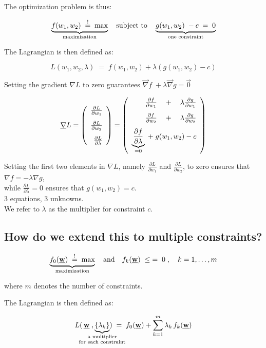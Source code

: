 \begin{frame}
The optimization problem is thus:

$$
\underbrace{f(w_1, w_2) \;\stackrel{\mathrm{!}}{=}\; \text{max}}_{\text{maximization}} \quad  \text{subject to} \quad \underbrace{g(w_1,w_2)\;-c\; = \; 0}_{\text{one constraint}}
$$

\newpage
The Lagrangian is then defined as:

$$
L(w_1, w_2, \lambda) \; = \; f(w_1,w_2) + \lambda(g(w_1, w_2)-c)
$$

Setting the gradient $\nabla L$ to zero guarantees $\vec \nabla f \;  + \lambda \vec \nabla g = \vec 0$

$$
\underline{\mathbf{\nabla}} L = 
\left( \begin{array}{rrrrrrrrrrrrrrrrrrrrrrrrrr} 
	\frac{\partial L}{\partial w_1} \\[0.3cm]
	\frac{\partial L}{\partial w_2} \\[0.3cm]
	\frac{\partial L}{\partial \lambda}
	\\ \end{array} \right)
=
\left( \begin{array}{rrrrrrrrrrrrrrrrrrrrrrrrrr} 
	\frac{\partial f}{\partial w_1} \quad+\quad \lambda \frac{\partial g}{\partial w_1} \\[0.3cm]
	\frac{\partial f}{\partial w_2} \quad+\quad \lambda \frac{\partial g}{\partial w_2} \\[0.3cm]
	\underbrace{\frac{\partial f}{\partial \lambda}}_{=0} \;+\; g(w_1, w_2)-c
	\\ \end{array} \right)
$$

Setting the first two elements in $\nabla L$, namely $\frac{\partial L}{\partial w_1}$ and $\frac{\partial L}{\partial w_2}$, to zero ensures that $\nabla f = -\lambda \nabla g$,\\
while $\frac{\partial L}{\partial \lambda}=0$ ensures that $g(w_1, w_2) = c$.\\

3 equations, 3 unknowns.\\

We refer to $\lambda$ as the multiplier for constraint $c$.


\subsection{How do we extend this to multiple constraints?}

$$
\underbrace{f_0(\underline{\mathbf{w}}) \;\stackrel{\mathrm{!}}{=}\; \text{max}}_{\text{maximization}} \quad  \text{and} \quad f_k(\underline{\mathbf{w}})\;\le\; = \; 0 \;, \quad k = 1,\ldots,m
$$

where $m$ denotes the number of constraints.

The Lagrangian is then defined as:

$$
L(\,\vec w\;, \underbrace{\{\lambda_k\}}_{
\mathclap{
\substack{\text{a multiplier} \\
\text{for each constraint}}
}
}) \; = \; f_0(\vec w) + \sum_{k=1}^{m} \lambda_k \, f_k(\vec w)
$$


\end{frame}


